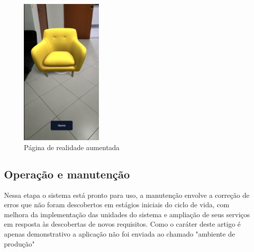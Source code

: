 \documentclass[conference]{IEEEtran}
\begin{document}
\begin{figure}[h]
  \caption{Página de realidade aumentada}

  \centering %
  \includegraphics[width=4cm]{assets/test_page.png}
\end{figure}

\subsection{Operação e manutenção}
Nessa etapa o sistema está pronto para uso, a manutenção envolve a correção de
erros que não foram descobertos em estágios iniciais do ciclo de vida, com
melhora da implementação das unidades do sistema e ampliação de seus serviços
em resposta às descobertas de novos requisitos. Como o caráter deste artigo é
apenas demonstrativo a aplicação não foi enviada ao chamado "ambiente de
produção"
\end{document}
